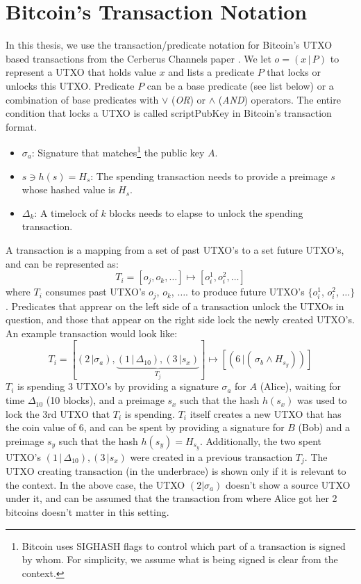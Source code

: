 \section{Bitcoin's Transaction Notation}
In this thesis, we use the transaction/predicate notation for Bitcoin's UTXO based transactions from the Cerberus Channels paper \cite{cerberus}. We let $o = (x\,|\,P)$ to represent a UTXO that holds value $x$ and lists a predicate $P$ that locks or unlocks this UTXO. Predicate $P$ can be a base predicate (see list below) or a combination of base predicates with $\lor$ (\textit{OR}) or $\land$ (\textit{AND}) operators. The entire condition that locks a UTXO is called scriptPubKey in Bitcoin's transaction format.
\begin{itemize}
    \item $\sigma_a$: Signature that matches\footnote{Bitcoin uses SIGHASH flags to control which part of a transaction is signed by whom. For simplicity, we assume what is being signed is clear from the context.} the public key $A$.
    \item $s \ni h(s) = H_s$: The spending transaction needs to provide a preimage $s$ whose hashed value is $H_s$.
    \item $\Delta_k$: A timelock of $k$ blocks needs to elapse to unlock the spending transaction.
\end{itemize}
A transaction is a mapping from a set of past UTXO's to a set future UTXO's, and can be represented as:
$$T_i = [o_j, o_k, \ldots] \mapsto [o_i^1, o_i^2, \ldots]$$
where $T_i$ consumes past UTXO's $o_j$, $o_k$, $\ldots$. to produce future UTXO's $\{o_i^1$, $o_i^2$, $\ldots\}$. Predicates that apprear on the left side of a transaction unlock the UTXOs in question, and those that appear on the right side lock the newly created UTXO's. An example transaction would look like:
$$T_i = [(2\,|\sigma_a), \underbrace{(1\,|\,\Delta_{10}), (3\,|s_x)}_{T_j}] \mapsto [(6\,|(\,\sigma_b \land H_{s_y}))]$$
$T_i$ is spending 3 UTXO's by providing a signature $\sigma_a$ for $A$ (Alice), waiting for time $\Delta_{10}$ (10 blocks), and a preimage $s_x$ such that the hash $h(s_x)$ was used to lock the 3rd UTXO that $T_i$ is spending. $T_i$ itself creates a new UTXO that has the coin value of 6, and can be spent by providing a signature for $B$ (Bob) and a preimage $s_y$ such that the hash $h(s_y) = H_{s_y}$. Additionally, the two spent UTXO's $(1\,|\,\Delta_{10}), (3\,|s_x)$ were created in a previous transaction $T_j$. The UTXO creating transaction (in the underbrace) is shown only if it is relevant to the context. In the above case, the UTXO $(2|\sigma_a)$ doesn't show a source UTXO under it, and can be assumed that the transaction from where Alice got her 2 bitcoins doesn't matter in this setting. 

